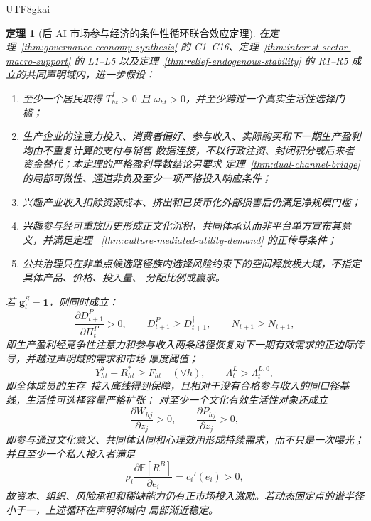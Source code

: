 \documentclass[12pt,a4paper,openany]{report}
\newtheorem{theorem}{定理}[chapter]
\newcommand{\EE}{\mathbb E}
\begin{document}
\begin{CJK*}{UTF8}{gkai}
\begin{theorem}[后 AI 市场参与经济的条件性循环联合效应定理]
\label{thm:post-ai-strategic-value}
在定理~\ref{thm:governance-economy-synthesis} 的 C1--C16、定理~\ref{thm:interest-sector-macro-support}
的 L1--L5 以及定理~\ref{thm:relief-endogenous-stability} 的 R1--R5 成立的共同声明域内，进一步假设：
\begin{enumerate}[label=\textup{(S\arabic*)},leftmargin=4em]
  \item 至少一个居民取得 \(T_{ht}^{I}>0\) 且 \(\omega_{ht}>0\)，并至少跨过一个真实生活性选择门槛；
  \item 生产企业的注意力投入、消费者偏好、参与收入、实际购买和下一期生产盈利均由不重复计算的支付与销售
  数据连接，不以行政注资、封闭积分或后来者资金替代；本定理的严格盈利导数结论另要求
  定理~\ref{thm:dual-channel-bridge} 的局部可微性、通道非负及至少一项严格投入响应条件；
  \item 兴趣产业收入扣除资源成本、挤出和已货币化外部损害后仍满足净规模门槛；
  \item 兴趣参与经可重放历史形成正文化沉积，共同体承认而非平台单方宣布其意义，并满足定理
  ~\ref{thm:culture-mediated-utility-demand} 的正传导条件；
  \item 公共治理只在非单点候选路径族内选择风险约束下的空间释放极大域，不指定具体产品、价格、投入量、
  分配比例或赢家。
\end{enumerate}
若 \(\mathbf g_t^S=\mathbf 1\)，则同时成立：
\[
  \frac{\partial D_{t+1}^{P}}{\partial\Pi_t^{P}}>0,
  \qquad
  D_{t+1}^{P}\ge D_{t+1}^{\dagger},
  \qquad
  N_{t+1}\ge\bar N_{t+1},
\]
即生产盈利经竞争性注意力和参与收入两条路径恢复对下一期有效需求的正边际传导，并越过声明域的需求和市场
厚度阈值；
\[
  Y_{ht}^{b}+R_{ht}^{*}\ge F_{ht}
  \quad(\forall h),
  \qquad
  \Lambda_t^{L}>\Lambda_t^{L,0},
\]
即全体成员的生存--接入底线得到保障，且相对于没有合格参与收入的同口径基线，生活性可选择容量严格扩张；
对至少一个文化有效生活性对象还成立
\[
  \frac{\partial W_{hj}}{\partial z_j}>0,
  \qquad
  \frac{\partial P_{hj}}{\partial z_j}>0,
\]
即参与通过文化意义、共同体认同和心理效用形成持续需求，而不只是一次曝光；
并且至少一个私人投入者满足
\[
  \rho_i\frac{\partial\EE[R^B]}{\partial e_i}
  =c_i'(e_i)>0,
\]
故资本、组织、风险承担和稀缺能力仍有正市场投入激励。若动态固定点的谱半径小于一，上述循环在声明邻域内
局部渐近稳定。


\end{theorem}
\end{CJK*}
\end{document}
